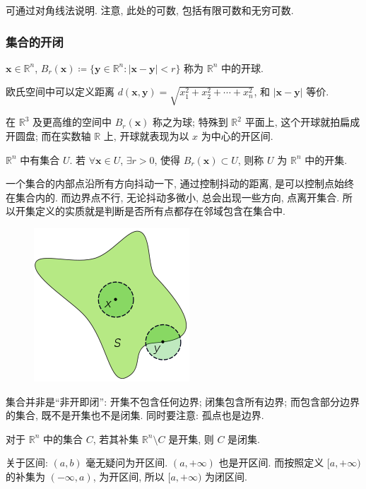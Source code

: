 \documentclass[UTF8]{ctexart}
\newcommand{\ve}[1]{\boldsymbol{\mathbf{#1}}}
\newcommand{\R}{\mathbb R}
\begin{document}
可通过对角线法说明. 注意, 此处的可数, 包括有限可数和无穷可数.

\subsubsection{集合的开闭}
\begin{definition}[\text{开球}]
    $ \ve x \in \R^n $, $ B_r (\ve x) \coloneqq \{ \ve y \in \R^n \colon |\ve x - \ve y| < r \} $ 称为 $ \R^n $ 中的开球.
\end{definition}

欧氏空间中可以定义距离 $ d(\ve x, \ve y) = \sqrt{x_1^2 + x_2^2 + \cdots + x_n^2} $, 和 $ |\ve x - \ve y| $ 等价.

在 $ \R^3 $ 及更高维的空间中 $ B_r(\ve x) $ 称之为球; 特殊到 $ \R^2 $ 平面上, 这个开球就拍扁成开圆盘; 而在实数轴 $ \R $ 上, 开球就表现为以 $ x $ 为中心的开区间.

\begin{definition}[\text{开集}]
    $ \R^n $ 中有集合 $ U $. 若 $ \forall \ve x \in U $, $ \exists r > 0 $, 使得 $ B_r (\ve x) \subset U $, 则称 $ U $ 为 $ \R^n $ 中的开集.
\end{definition}

一个集合的内部点沿所有方向抖动一下, 通过控制抖动的距离, 是可以控制点始终在集合内的. 而边界点不行, 无论抖动多微小, 总会出现一些方向, 点离开集合. 所以开集定义的实质就是判断是否所有点都存在邻域包含在集合中.

\begin{figure}[H]
    \centering
    \includegraphics[width = 0.3\linewidth]{./images/set1.png}
\end{figure}


集合并非是``非开即闭'': 开集不包含任何边界; 闭集包含所有边界; 而包含部分边界的集合, 既不是开集也不是闭集. 同时要注意: 孤点也是边界.

\begin{definition}[\text{闭集}]
    对于 $ \R^n $ 中的集合 $ C $, 若其补集 $ \R^n \setminus C $ 是开集, 则 $ C $ 是闭集.
\end{definition}

关于区间: $ (a, b) $ 毫无疑问为开区间. $ (a, +\infty) $ 也是开区间. 而按照定义 $ [a, +\infty) $ 的补集为 $ (-\infty, a) $, 为开区间, 所以 $ [a, +\infty) $ 为闭区间.
\end{document}
